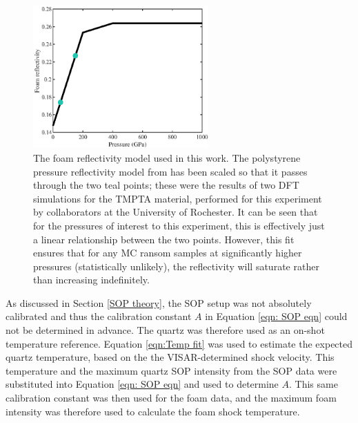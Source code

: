 \begin{figure} [h]
\begin{centering}
\includegraphics[width=0.6\textwidth]{figures/Experiment/FoamReflectivity.eps}%
\caption{\label{fig:Foam Reflectivity} The foam reflectivity model used in this work. The polystyrene pressure reflectivity model from \cite{Hu2014} has been scaled so that it passes through the two teal points; these were the results of two DFT simulations for the TMPTA material, performed for this experiment by collaborators at the University of Rochester. It can be seen that for the pressures of interest to this experiment, this is effectively just a linear relationship between the two points. However, this fit ensures that for any MC ransom samples at significantly higher pressures (statistically unlikely), the reflectivity will saturate rather than increasing indefinitely.}
\end{centering}
\end{figure}

As discussed in Section \ref{SOP theory}, the SOP setup was not absolutely calibrated and thus the calibration constant $A$ in Equation \ref{eqn: SOP eqn} could not be determined in advance. The quartz was therefore used as an on-shot temperature reference. Equation \ref{eqn:Temp fit} was used to estimate the expected quartz temperature, based on the the VISAR-determined shock velocity. This temperature and the maximum quartz SOP intensity from the SOP data were substituted into Equation \ref{eqn: SOP eqn} and used to determine $A$. This same calibration constant was then used for the foam data, and the maximum foam intensity was therefore used to calculate the foam shock temperature.

